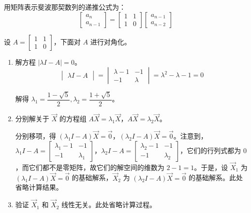 \begin{solve}
	用矩阵表示斐波那契数列的递推公式为：
	$$
	\begin{bmatrix} a_n \\ a_{n - 1}\end{bmatrix}
	=
	\begin{bmatrix} 1 & 1 \\ 1 & 0 \end{bmatrix}
	\begin{bmatrix} a_{n - 1} \\ a_{n - 2} \end{bmatrix}
	$$

	设 $A = \begin{bmatrix} 1 & 1 \\ 1 & 0 \end{bmatrix}$，下面对 $A$ 进行对角化。

	\begin{enumerate}
		\item 解方程 $|\lambda I - A| = 0$。
		$$
		\begin{vmatrix}\lambda I - A\end{vmatrix} =
		\begin{vmatrix} \lambda - 1 & -1 \\ -1 & \lambda \end{vmatrix} =
		\lambda^2 - \lambda - 1 = 0
		$$

		解得 $\lambda_1 = \dfrac{1 - \sqrt 5}{2}, \lambda_2 = \dfrac{1 + \sqrt 5}{2}$。

		\item 分别解关于 $\vec X$ 的方程组 $A \vec X = \lambda_1 \vec X$，$A \vec X = \lambda_2 \vec X$。

		分别移项，得 $(\lambda_1 I - A) \vec X = \vec 0$，$(\lambda_2 I - A) \vec X = \vec 0$。注意到，$\lambda_1 I - A = \begin{bmatrix} \lambda_1 - 1 & -1 \\ -1 & \lambda_1 \end{bmatrix}$，$\lambda_2 I - A = \begin{bmatrix} \lambda_2 - 1 & -1 \\ -1 & \lambda_2 \end{bmatrix}$，它们的行列式都为 $0$，而它们都不是零矩阵，故它们的解空间的维数为 $2 - 1 = 1$。于是，设 $\vec X_1$ 为 $(\lambda_1 I - A) \vec X = \vec 0$ 的基础解系，$\vec X_2$ 为 $(\lambda_2 I - A) \vec X = \vec 0$ 的基础解系。此处省略计算结果。

		\item 验证 $\vec X_1$ 和 $\vec X_2$ 线性无关。此处省略计算过程。
	\end{enumerate}


\end{solve}
